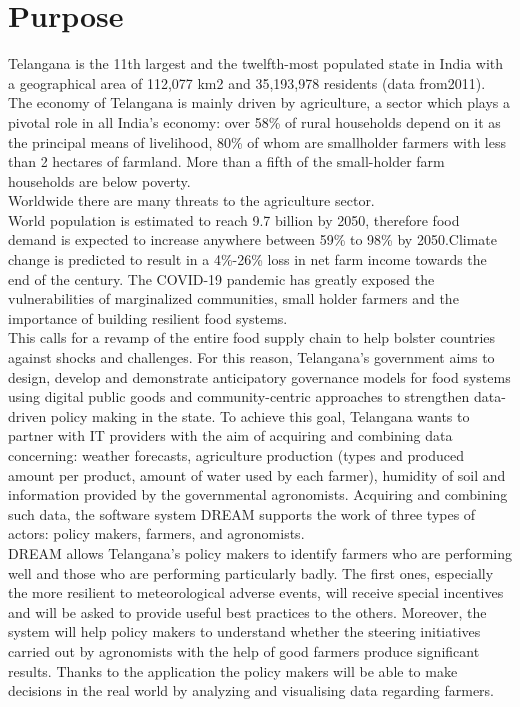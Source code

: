 \section{Purpose}

Telangana is the 11th largest and the twelfth-most populated state in India with a geographical area of 112,077 km2 and 35,193,978 residents (data from2011).
The economy of Telangana is mainly driven by agriculture, a sector which plays a pivotal role in all India’s economy: over 58\% of rural households depend on it as the principal means of livelihood, 80\% of whom are smallholder farmers with less than 2 hectares of farmland. More than a fifth of the small-holder farm households are below poverty. \\

Worldwide there are many threats to the agriculture sector.\\ World population is estimated to reach 9.7 billion by 2050, therefore food demand is expected to increase anywhere between 59\% to 98\% by 2050.Climate change is predicted to result in a 4\%-26\% loss in net farm income towards the end of the century. The COVID-19 pandemic has greatly exposed the vulnerabilities of marginalized communities, small holder farmers and the importance of building resilient food systems.\\

This calls for a revamp of the entire food supply chain to help bolster countries against shocks and challenges. For this reason, Telangana’s government aims to design, develop and demonstrate anticipatory governance models for food systems using digital public goods and community-centric approaches to strengthen data-driven policy making in the state. To achieve this goal, Telangana wants to partner with IT providers with the aim of acquiring and combining data concerning: weather forecasts, agriculture production (types and produced amount per product, amount of water used by each farmer), humidity of soil and information provided by the governmental agronomists. Acquiring and combining such data, the software system DREAM supports the work of three types of actors: policy makers, farmers, and agronomists.\\

DREAM allows Telangana’s policy makers to identify farmers who are performing well and those who are performing particularly badly. The first ones, especially the more resilient to meteorological adverse events, will receive special incentives and will be asked to provide useful best practices to the others. Moreover, the system will help policy makers to understand whether the steering initiatives carried out by agronomists with the help of good farmers produce significant results.
Thanks to the application the policy makers will be able to make decisions in the real world by analyzing and visualising data regarding farmers.\\

